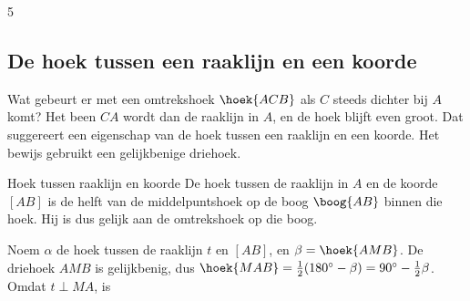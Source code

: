 \begin{alleenvoor}{5}
\subsection{De hoek tussen een raaklijn en een koorde}

Wat gebeurt er met een omtrekshoek $\hoek{ACB}$ als $C$ steeds dichter bij $A$ komt? Het been $CA$ wordt dan de raaklijn in $A$, en de hoek blijft even groot. Dat suggereert een eigenschap van de hoek tussen een raaklijn en een koorde. Het bewijs gebruikt een gelijkbenige driehoek.

\begin{theorie}
\begin{minipage}[t]{.64\linewidth}
\vspace{0pt}
\begin{stelling}{Hoek tussen raaklijn en koorde}
De hoek tussen de raaklijn in $A$ en de koorde $[AB]$ is de helft van de middelpuntshoek op de boog $\boog{AB}$ binnen die hoek. Hij is dus gelijk aan de omtrekshoek op die boog.
\end{stelling}

\begin{bewijs}
Noem $\alpha$ de hoek tussen de raaklijn $t$ en $[AB]$, en $\beta = \hoek{AMB}$. De driehoek $AMB$ is gelijkbenig, dus $\hoek{MAB} = \tfrac12(180^\circ - \beta) = 90^\circ - \tfrac12\beta$. Omdat $t \perp MA$, is
\end{bewijs}
\end{minipage}\hfill
\begin{minipage}[t]{.32\linewidth}
\vspace{0pt}
\centering
{}
\end{minipage}
\end{theorie}


\begin{oefeningen}
\end{oefeningen}
\end{alleenvoor}

